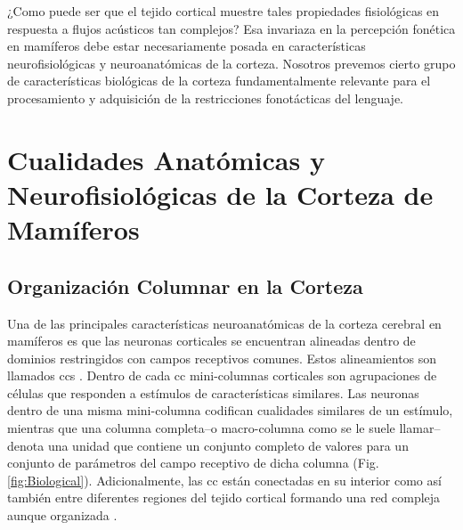 ¿Como puede ser que el tejido cortical muestre tales propiedades fisiológicas en respuesta a flujos acústicos tan complejos? Esa invariaza en la percepción fonética en mamíferos debe estar necesariamente posada en características neurofisiológicas y neuroanatómicas de la corteza. Nosotros prevemos cierto grupo de características biológicas de la corteza fundamentalmente relevante para el procesamiento y adquisición de la restricciones fonotácticas del lenguaje.








\section{Cualidades Anatómicas y Neurofisiológicas de la Corteza de Mamíferos}

\subsection{Organización Columnar en la Corteza}

Una de las principales características neuroanatómicas de la corteza cerebral en mamíferos es que las neuronas corticales se encuentran alineadas dentro de dominios restringidos con campos receptivos comunes. Estos alineamientos son llamados \glspl{cc} \cite{mountcastle_1955, mountcastle_modality_1957, hubel_1962, hubel_1968}. Dentro de cada \gls{cc} mini-columnas corticales son agrupaciones de células que responden a estímulos de características similares. Las neuronas dentro de una misma mini-columna codifican cualidades similares de un estímulo, mientras que una columna completa--o macro-columna como se le suele llamar--denota una unidad que contiene un conjunto completo de valores para un conjunto de parámetros del campo receptivo de dicha columna \cite{horton_cortical_2005} (Fig. \ref{fig:Biological}). Adicionalmente, las \gls{cc} están conectadas en su interior como así también entre diferentes regiones del tejido cortical formando una red compleja aunque organizada \cite{mountcastle_1997}.

